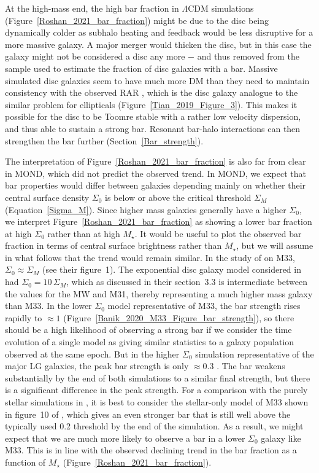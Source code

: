 \documentclass[fleqn,usenatbib,useAMS,onecolumn]{mnras} %
\begin{document}
At the high-mass end, the high bar fraction in $\Lambda$CDM simulations (Figure~\ref{Roshan_2021_bar_fraction}) might be due to the disc being dynamically colder as subhalo heating and feedback would be less disruptive for a more massive galaxy. A major merger would thicken the disc, but in this case the galaxy might not be considered a disc any more $-$ and thus removed from the sample used to estimate the fraction of disc galaxies with a bar. Massive simulated disc galaxies seem to have much more DM than they need to maintain consistency with the observed RAR \citep{Marasco_2020}, which is the disc galaxy analogue to the similar problem for ellipticals (Figure~\ref{Tian_2019_Figure_3}). This makes it possible for the disc to be Toomre stable with a rather low velocity dispersion, and thus able to sustain a strong bar. Resonant bar-halo interactions can then strengthen the bar further (Section~\ref{Bar_strength}).

The interpretation of Figure~\ref{Roshan_2021_bar_fraction} is also far from clear in MOND, which did not predict the observed trend. In MOND, we expect that bar properties would differ between galaxies depending mainly on whether their central surface density $\Sigma_0$ is below or above the critical threshold $\Sigma_M$ (Equation~\ref{Sigma_M}). Since higher mass galaxies generally have a higher $\Sigma_0$, we interpret Figure~\ref{Roshan_2021_bar_fraction} as showing a lower bar fraction at high $\Sigma_0$ rather than at high $M_{\star}$. It would be useful to plot the observed bar fraction in terms of central surface brightness rather than $M_{\star}$, but we will assume in what follows that the trend would remain similar. In the study of \citet{Banik_2020_M33} on M33, $\Sigma_0 \approx \Sigma_M$ (see their figure~1). The exponential disc galaxy model considered in \citet{Roshan_2021_disc_stability} had $\Sigma_0 = 10 \, \Sigma_M$, which as discussed in their section~3.3 is intermediate between the values for the MW and M31, thereby representing a much higher mass galaxy than M33. In the lower $\Sigma_0$ model representative of M33, the bar strength rises rapidly to $\approx 1$ (Figure~\ref{Banik_2020_M33_Figure_bar_strength}), so there should be a high likelihood of observing a strong bar if we consider the time evolution of a single model as giving similar statistics to a galaxy population observed at the same epoch. But in the higher $\Sigma_0$ simulation representative of the major LG galaxies, the peak bar strength is only $\approx 0.3$ \citep[see figure~13 of][]{Roshan_2021_disc_stability}. The bar weakens substantially by the end of both simulations to a similar final strength, but there is a significant difference in the peak strength. For a comparison with the purely stellar simulations in \citet{Roshan_2021_disc_stability}, it is best to consider the stellar-only model of M33 shown in figure~10 of \citet{Banik_2020_M33}, which gives an even stronger bar that is still well above the typically used 0.2 threshold by the end of the simulation. As a result, we might expect that we are much more likely to observe a bar in a lower $\Sigma_0$ galaxy like M33. This is in line with the observed declining trend in the bar fraction as a function of $M_{\star}$ (Figure~\ref{Roshan_2021_bar_fraction}).
\end{document}
